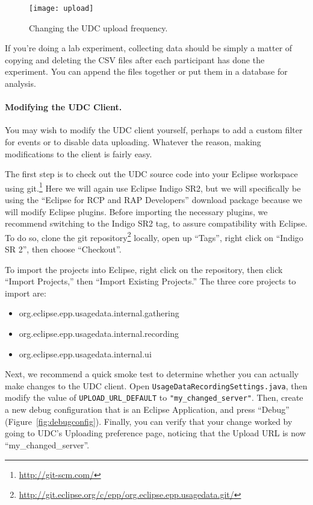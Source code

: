 \begin{figure}
  \centering
  \texttt{[image: upload]}
  \caption{Changing the UDC upload frequency.}\label{fig:upload}
\end{figure}

If you're doing a lab experiment, collecting data should be simply a matter of
copying and deleting the CSV files after each participant has done the experiment.
You can append the files together or put them in a database for analysis.

\paragraph{Modifying the UDC Client.}

You may wish to modify the UDC client yourself, perhaps to add a custom filter for events
or to disable data uploading.
Whatever the reason, making modifications to the client is fairly easy.

The first step is to check out the UDC source code into your Eclipse
workspace using git.\footnote{\url{http://git-scm.com/}}
Here we will again use Eclipse Indigo SR2, but we will specifically be using the
``Eclipse for RCP and RAP Developers'' download package because we will
modify Eclipse plugins.
Before importing the necessary plugins, we recommend switching to
the Indigo SR2 tag, to assure compatibility with
Eclipse.
To do so, clone the git repository\footnote{\url{http://git.eclipse.org/c/epp/org.eclipse.epp.usagedata.git/}}
locally, open up ``Tags'', right click on ``Indigo SR 2'',
then choose ``Checkout''.

To import the projects into Eclipse, right click on the repository, then click
``Import Projects,'' then ``Import Existing Projects.''
The three core projects to import are:

\begin{itemize}
\item org.eclipse.epp.usagedata.internal.gathering
\item org.eclipse.epp.usagedata.internal.recording
\item org.eclipse.epp.usagedata.internal.ui
\end{itemize}

Next, we recommend a quick smoke test to determine whether you
can actually make changes to the UDC client.
Open \texttt{UsageDataRecordingSettings.java}, then modify the value of \texttt{UPLOAD\_URL\_DEFAULT}
to \texttt{"my\_changed\_server"}.
Then, create a new debug configuration that is an Eclipse Application, and press
``Debug'' (Figure~\ref{fig:debugconfig}).
Finally, you can verify that your change worked by going to UDC's Uploading
preference page, noticing that the Upload URL is now ``my\_changed\_server''.

